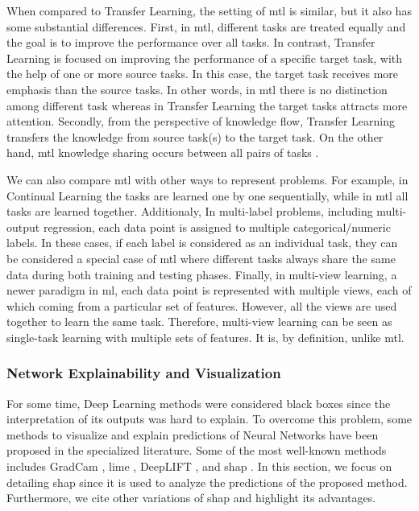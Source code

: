 When compared to Transfer Learning, the setting of \acs{mtl} is similar, but it also has some substantial differences. First, in \acs{mtl}, different tasks are treated equally and the goal is to improve the performance over all tasks. In contrast, Transfer Learning is focused on improving the performance of a specific target task, with the help of one or more source tasks. In this case, the target task receives more emphasis than the source tasks. In other words, in \acs{mtl} there is no distinction among different task whereas in Transfer Learning the target tasks attracts more attention. Secondly, from the perspective of knowledge flow, Transfer Learning transfers the knowledge from source task(s) to the target task. On the other hand, \acl{mtl} knowledge sharing occurs between all pairs of tasks \cite{zhang2017survey}.

We can also compare \acs{mtl} with other ways to represent problems. For example, in Continual Learning the tasks are learned one by one sequentially, while in \acs{mtl} all tasks are learned together. Additionaly, In multi-label problems, including multi-output regression, each data point is assigned to multiple categorical/numeric labels. In these cases, if each label is considered as an individual task, they can be considered a special case of \acl{mtl} where different tasks always share the same data during both training and testing phases. Finally, in multi-view learning, a newer paradigm in \acl{ml}, each data point is represented with multiple views, each of which coming from a particular set of features. However, all the views are used together to learn the same task. Therefore, multi-view learning can be seen as single-task learning with multiple sets of features. It is, by definition, unlike \acs{mtl}.

\subsubsection{Network Explainability and Visualization}

For some time, Deep Learning methods were considered black boxes since the interpretation of its outputs was hard to explain. To overcome this problem, some methods to visualize and explain predictions of Neural Networks have been proposed in the specialized literature. Some of the most well-known methods includes GradCam \citep{gradcam}, \acf{lime} \citep{lime}, DeepLIFT \citep{deeplift_old, deeplift_new}, and \acs{shap} \citep{shap2018}. In this section, we focus on detailing \acs{shap} since it is used to analyze the predictions of the proposed method. Furthermore, we cite other variations of \acs{shap} and highlight its advantages.

